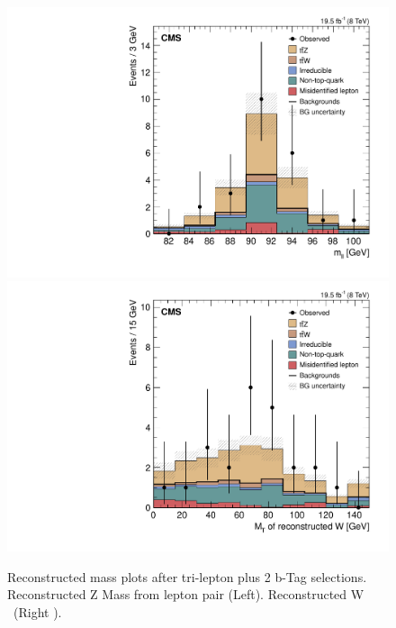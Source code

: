 \begin{figure}[h]
\begin{center}
\includegraphics[width=0.48\linewidth]{Figs/Plots_PreSelections/hZMass_3L2b.pdf}
\includegraphics[width=0.48\linewidth]{Figs/Plots_PreSelections/hWMt_3L2b.pdf}
\caption{\label{fig:hmass_3L2b}
Reconstructed mass plots after tri-lepton plus 2 b-Tag selections. Reconstructed Z Mass from lepton pair (Left). Reconstructed W \Mt \ (Right ).
}
\end{center}
\end{figure}

